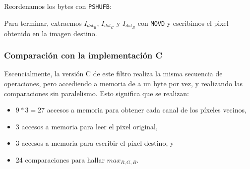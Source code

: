 \begin{center}
\end{center}

Reordenamos los bytes con \texttt{PSHUFB}:

\begin{center}
\end{center}

Para terminar, extraemos $I_{dst_R}$, $I_{dst_G}$ y $I_{dst_B}$ con \texttt{MOVD}
y escribimos el pixel obtenido en la imagen destino.




\subsubsection{Comparación con la implementación C}

Escencialmente, la versión C de este filtro realiza la misma secuencia de operaciones,
pero accediendo a memoria de a un byte por vez, y realizando las comparaciones
sin paralelismo. Esto significa que se realizan:

\begin{itemize}
    \item $9 * 3 = 27$ accesos a memoria para obtener cada canal de los píxeles vecinos,
    \item 3 accesos a memoria para leer el pixel original,
    \item 3 accesos a memoria para escribir el pixel destino, y
    \item 24 comparaciones para hallar $max_{R,G,B}$.
\end{itemize}

